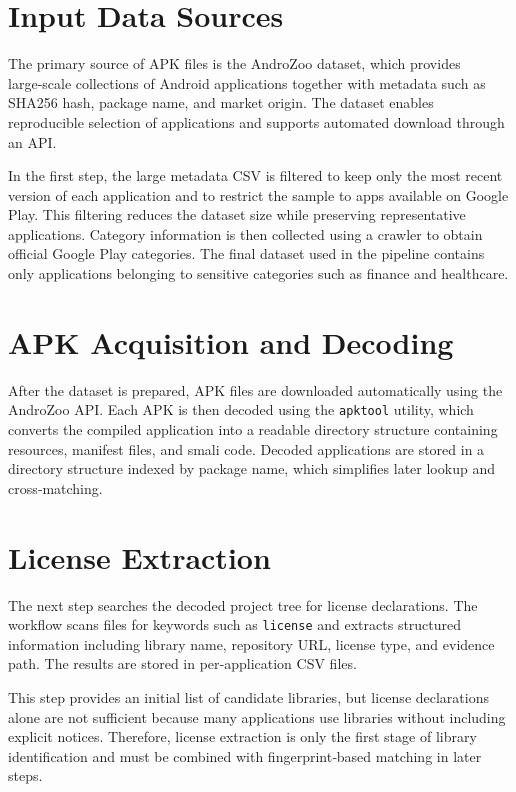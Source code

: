 \documentclass[12pt,a4paper]{report}
\begin{document}
\section{Input Data Sources}
The primary source of APK files is the AndroZoo dataset, which provides large‑scale collections of Android applications together with metadata such as SHA256 hash, package name, and market origin. The dataset enables reproducible selection of applications and supports automated download through an API. 

In the first step, the large metadata CSV is filtered to keep only the most recent version of each application and to restrict the sample to apps available on Google Play. This filtering reduces the dataset size while preserving representative applications. Category information is then collected using a crawler to obtain official Google Play categories. The final dataset used in the pipeline contains only applications belonging to sensitive categories such as finance and healthcare. 

\section{APK Acquisition and Decoding}
After the dataset is prepared, APK files are downloaded automatically using the AndroZoo API. Each APK is then decoded using the \texttt{apktool} utility, which converts the compiled application into a readable directory structure containing resources, manifest files, and smali code. Decoded applications are stored in a directory structure indexed by package name, which simplifies later lookup and cross‑matching. 

\section{License Extraction}
The next step searches the decoded project tree for license declarations. The workflow scans files for keywords such as \texttt{license} and extracts structured information including library name, repository URL, license type, and evidence path. The results are stored in per‑application CSV files. 

This step provides an initial list of candidate libraries, but license declarations alone are not sufficient because many applications use libraries without including explicit notices. Therefore, license extraction is only the first stage of library identification and must be combined with fingerprint‑based matching in later steps. 
\end{document}
